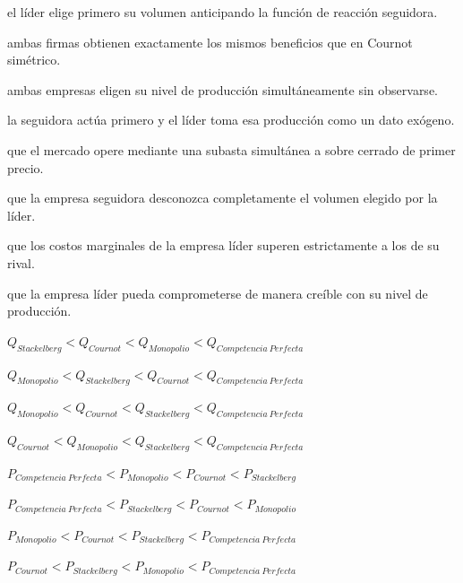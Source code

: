 \begin{opts}
    \item el líder elige primero su volumen anticipando la función de reacción seguidora.
    \item ambas firmas obtienen exactamente los mismos beneficios que en Cournot simétrico.
    \item ambas empresas eligen su nivel de producción simultáneamente sin observarse.
    \item la seguidora actúa primero y el líder toma esa producción como un dato exógeno.
\end{opts}

\begin{opts}
    \item que el mercado opere mediante una subasta simultánea a sobre cerrado de primer precio.
    \item que la empresa seguidora desconozca completamente el volumen elegido por la líder.
    \item que los costos marginales de la empresa líder superen estrictamente a los de su rival.
    \item que la empresa líder pueda comprometerse de manera creíble con su nivel de producción.
\end{opts}

\begin{opts}
    \item $Q_{Stackelberg} < Q_{Cournot} < Q_{Monopolio} < Q_{Competencia\ Perfecta}$
    \item $Q_{Monopolio} < Q_{Stackelberg} < Q_{Cournot} < Q_{Competencia\ Perfecta}$
    \item $Q_{Monopolio} < Q_{Cournot} < Q_{Stackelberg} < Q_{Competencia\ Perfecta}$
    \item $Q_{Cournot} < Q_{Monopolio} < Q_{Stackelberg} < Q_{Competencia\ Perfecta}$
\end{opts}

\begin{opts}
    \item $P_{Competencia\ Perfecta} < P_{Monopolio} < P_{Cournot} < P_{Stackelberg}$
    \item $P_{Competencia\ Perfecta} < P_{Stackelberg} < P_{Cournot} < P_{Monopolio}$
    \item $P_{Monopolio} < P_{Cournot} < P_{Stackelberg} < P_{Competencia\ Perfecta}$
    \item $P_{Cournot} < P_{Stackelberg} < P_{Monopolio} < P_{Competencia\ Perfecta}$
\end{opts}

